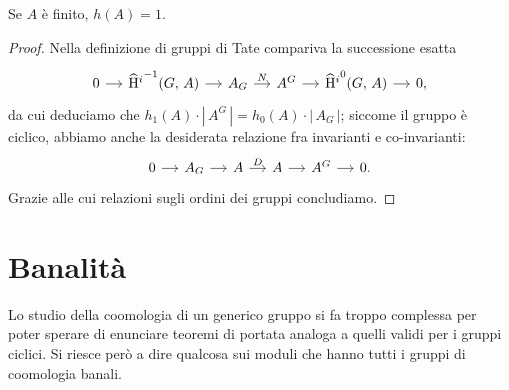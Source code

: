 \begin{lemma}\label{Herb2}
	Se $ A $ è finito, $ h(A) = 1 $.
\end{lemma}
\begin{proof}
	Nella definizione di gruppi di Tate compariva la successione esatta
	\begin{equation*}			\begin{tikzcd}[column sep = small]
	0 \rar& \Hh^{-1}(G, \, A) \rar& A_G \rar["N"]& A^G \rar&\Hh^0(G, \, A) \rar& 0,
	\end{tikzcd}
	\end{equation*}
	da cui deduciamo che $ h_1(A) \cdot |\, A^G\, | =  h_0(A) \cdot |\, A_G\, | $; siccome il gruppo è ciclico, abbiamo anche la desiderata relazione fra invarianti e co-invarianti:
	\begin{equation*}
	\begin{tikzcd}[column sep = small]
	0 \rar& A_G \rar& A \rar["D"]& A \rar& A^G \rar& 0.
	\end{tikzcd}
	\end{equation*}
	Grazie alle cui relazioni sugli ordini dei gruppi concludiamo.
\end{proof}


%
%


\section{Banalità}
Lo studio della coomologia di un generico gruppo si fa troppo complessa per poter sperare di enunciare teoremi di portata analoga a quelli validi per i gruppi ciclici. Si riesce però a dire qualcosa sui moduli che hanno tutti i gruppi di coomologia banali.


